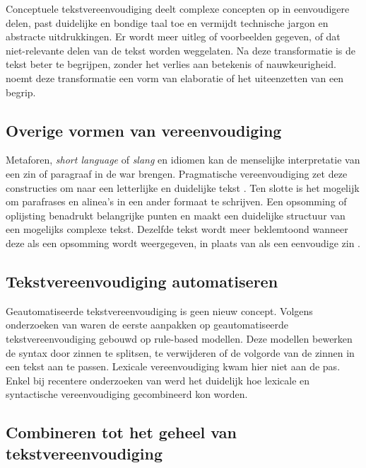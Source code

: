 Conceptuele tekstvereenvoudiging deelt complexe concepten op in eenvoudigere delen, past duidelijke en bondige taal toe en vermijdt technische jargon en abstracte uitdrukkingen. Er wordt meer uitleg of voorbeelden gegeven, of dat niet-relevante delen van de tekst worden weggelaten. Na deze transformatie is de tekst beter te begrijpen, zonder het verlies aan betekenis of nauwkeurigheid. \textcite{Siddharthan2014} noemt deze transformatie een vorm van elaboratie of het uiteenzetten van een begrip.

\subsection{Overige vormen van vereenvoudiging}

Metaforen, \textit{short language} of \textit{slang} en idiomen kan de menselijke interpretatie van een zin of paragraaf in de war brengen. Pragmatische vereenvoudiging zet deze constructies om naar een letterlijke en duidelijke tekst \autocite{JavoureyDrevet2022}. Ten slotte is het mogelijk om parafrases en alinea's in een ander formaat te schrijven. Een opsomming of oplijsting benadrukt belangrijke punten en maakt een duidelijke structuur van een mogelijks complexe tekst. Dezelfde tekst wordt meer beklemtoond wanneer deze als een opsomming wordt weergegeven, in plaats van als een eenvoudige zin \autocite{Siddharthan2014, Hale2022}. 

\subsection{Tekstvereenvoudiging automatiseren}

Geautomatiseerde tekstvereenvoudiging is geen nieuw concept. Volgens onderzoeken van \textcite{Canning2000, Siddharthan2006} waren de eerste aanpakken op geautomatiseerde tekstvereenvoudiging gebouwd op rule-based modellen. Deze modellen bewerken de syntax door zinnen te splitsen, te verwijderen of de volgorde van de zinnen in een tekst aan te passen. Lexicale vereenvoudiging kwam hier niet aan de pas. Enkel bij recentere onderzoeken van \textcite{Coster2011, Bulte2018} werd het duidelijk hoe lexicale en syntactische vereenvoudiging gecombineerd kon worden.

\subsection{Combineren tot het geheel van tekstvereenvoudiging}

